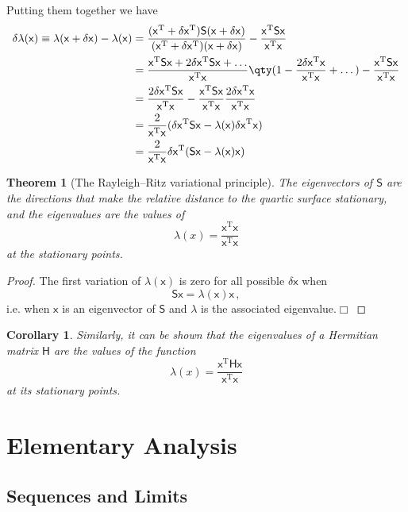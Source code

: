 \documentclass{article}
\theoremstyle{plain}\theoremheaderfont{\normalfont\itshape}\theorembodyfont{\rmfamily}\theoremseparator{.}\newtheorem*{rem}{Remark}\newtheorem*{ex}{Example}\newtheorem*{proof}{Proof}\newtheorem*{altp}{Alternative proof}
\theoremstyle{plain}\theoremheaderfont{\normalfont\bfseries}\theorembodyfont{\rmfamily}\theoremseparator{.}\newtheorem{thm}{Theorem}[section]\newtheorem{lem}[thm]{Lemma}\newtheorem{prop}[thm]{Proposition}\newtheorem*{cor}{Corollary}\newtheorem{defn}[thm]{Definition}\newtheorem{clm}[thm]{Claim}\newtheorem{clminproof}{Claim}
\theoremstyle{break}\theoremheaderfont{\normalfont\itshape}\theorembodyfont{\rmfamily}\theoremseparator{.\medskip}\newtheorem*{proofskip}{Proof}\newtheorem*{exs}{Examples}\newtheorem*{rems}{Remarks}
\theoremstyle{break}\theoremheaderfont{\normalfont\bfseries}\theorembodyfont{\rmfamily}\theoremseparator{.\medskip}\newtheorem{lemskip}[thm]{Lemma}\newtheorem{defnskip}[thm]{Definition}\newtheorem{propskip}[thm]{Proposition}\newtheorem{thmskip}[thm]{Theorem}
\numberwithin{equation}{section}
\newcommand{\qed}{\hfill\ensuremath{\Box}}
\newcommand{\tp}{^\mathrm{T}}
\begin{document}
	Putting them together we have
	\begin{align*}
		\delta\lambda(\mathsf{x})\equiv\lambda(\mathsf{x}+\delta\mathsf{x})-\lambda(\mathsf{x})&=\frac{(\mathsf{x\tp}+\delta\mathsf{x}\tp)\mathsf{S}(\mathsf{x}+\delta\mathsf{x})}{(\mathsf{x\tp}+\delta\mathsf{x}\tp)(\mathsf{x}+\delta\mathsf{x})}-\frac{\mathsf{x\tp Sx}}{\mathsf{x\tp x}}\\
		&=\frac{\mathsf{x\tp Sx}+2\delta\mathsf{x}\tp\mathsf{Sx}+\dots}{\mathsf{x\tp x}}\qty(1-\frac{2\delta\mathsf{x}\tp\mathsf{x}}{\mathsf{x\tp x}}+\dots)-\frac{\mathsf{x\tp Sx}}{\mathsf{x\tp x}}\\
		&=\frac{2\delta\mathsf{x}\tp\mathsf{Sx}}{\mathsf{x\tp x}}-\frac{\mathsf{x\tp Sx}}{\mathsf{x\tp x}}\frac{2\delta\mathsf{x}\tp\mathsf{x}}{\mathsf{x\tp x}}\\
		&=\frac{2}{\mathsf{x\tp x}}(\delta\mathsf{x}\tp\mathsf{Sx}-\lambda(\mathsf{x})\delta\mathsf{x}\tp\mathsf{x})\\
		&=\frac{2}{\mathsf{x\tp x}}\delta\mathsf{x}\tp(\mathsf{Sx}-\lambda(\mathsf{x})\mathsf{x})
	\end{align*}

	\begin{thm}[The Rayleigh--Ritz variational principle]
		The eigenvectors of \(\mathsf{S}\) are the directions that make the relative distance to the quartic surface stationary, and the eigenvalues are the values of
		\[\lambda(x)=\frac{\mathsf{x\tp x}}{\mathsf{x\tp x}}\]
		at the stationary points.
	\end{thm}
	\begin{proof}
		The first variation of \(\lambda(\mathsf{x})\) is zero for all possible \(\delta\mathsf{x}\) when
		\[\mathsf{Sx}=\lambda(\mathsf{x})\mathsf{x}\,,\]
		i.e. when \(\mathsf{x}\) is an eigenvector of \(\mathsf{S}\) and \(\lambda\) is the associated eigenvalue.\qed
	\end{proof}
	\begin{cor}
		Similarly, it can be shown that the eigenvalues of a Hermitian matrix \(\mathsf{H}\) are the values of the function
		\[\lambda(x)=\frac{\mathsf{x\tp Hx}}{\mathsf{x\tp x}}\]
		at its stationary points.
	\end{cor}

	\newpage
	\section{Elementary Analysis}
	\subsection{Sequences and Limits}
\end{document}
